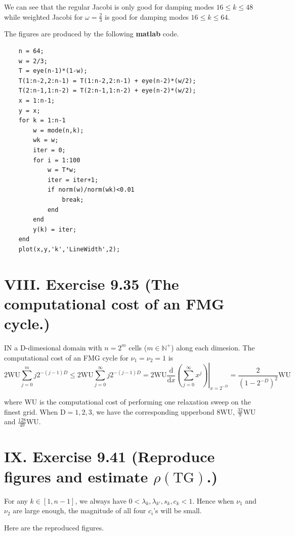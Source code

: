 \documentclass[twoside,a4paper]{article}
\begin{document}
We can see that the regular Jacobi is only good for damping modes $16\leq k\leq 48$ while weighted Jacobi for $\omega=\frac{2}{3}$ is good for damping modes $16\leq k\leq 64$.

The figures are produced by the following \textbf{matlab} code.
\begin{lstlisting}
    n = 64;
    w = 2/3;
    T = eye(n-1)*(1-w);
    T(1:n-2,2:n-1) = T(1:n-2,2:n-1) + eye(n-2)*(w/2);
    T(2:n-1,1:n-2) = T(2:n-1,1:n-2) + eye(n-2)*(w/2);
    x = 1:n-1;
    y = x;
    for k = 1:n-1
        w = mode(n,k);
        wk = w;
        iter = 0;
        for i = 1:100
            w = T*w;
            iter = iter+1;
            if norm(w)/norm(wk)<0.01
                break;
            end
        end
        y(k) = iter;
    end
    plot(x,y,'k','LineWidth',2);
\end{lstlisting}

\section*{VIII. Exercise 9.35 (The computational cost of an FMG cycle.)}

\;\;\;\;\;\;IN a D-dimesional domain with $n=2^m$ cells ($m\in\mathbb{N}^+$) along each dimesion. The computational cost of an FMG cycle for $\nu_1=\nu_2=1$ is
\begin{equation*}
    2\text{WU}\sum_{j=0}^mj2^{-(j-1)D}\leq 2\text{WU}\sum_{j=0}^\infty j2^{-(j-1)D}=2\text{WU}\left.\frac{\text{d}}{\text{d}x}\left(\sum_{j=0}^\infty x^j\right)\right|_{x=2^{-D}}=\frac{2}{(1-2^{-D})^2}\text{WU}
\end{equation*}

where WU is the computational cost of performing one relaxation sweep on the finest grid. When D$=1,2,3$, we have the corresponding upperbond $8\text{WU}$, $\frac{32}{9}\text{WU}$ and $\frac{128}{49}\text{WU}$.

\section*{IX. Exercise 9.41 (Reproduce figures and estimate $\rho(\text{TG})$.)}

\;\;\;\;\;\;For any $k\in[1,n-1]$, we always have $0<\lambda_k,\lambda_{k'},s_k,c_k<1$. Hence when $\nu_1$ and $\nu_2$ are large enough, the magnitude of all four $c_i$'s will be small.

Here are the reproduced figures.
\end{document}
